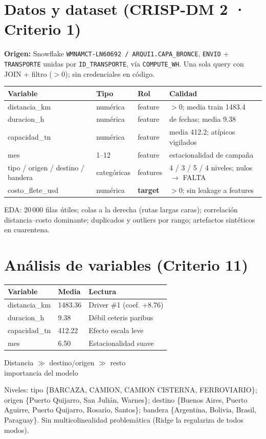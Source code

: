\documentclass[11pt]{article}
\begin{document}
\section{Datos y dataset (CRISP-DM 2 · Criterio 1)}
\textbf{Origen:} Snowflake \texttt{WMNAMCT-LN60692 / ARQUI1.CAPA\_BRONCE},
\texttt{ENVIO} + \texttt{TRANSPORTE} unidas por \texttt{ID\_TRANSPORTE}, vía
\texttt{COMPUTE\_WH}. Una sola query con JOIN + filtro ($>0$); sin credenciales en código.
{\small
\begin{center}
\begin{tabular}{llll}
\toprule Variable & Tipo & Rol & Calidad \\
\midrule distancia\_km & numérica & feature & $>0$; media train 1483.4 \\
duracion\_h & numérica & feature & de fechas; media 9.38 \\
capacidad\_tn & numérica & feature & media 412.2; atípicos vigilados \\
mes & 1--12 & feature & estacionalidad de campaña \\
tipo / origen / destino / bandera & categóricas & features & 4 / 3 / 5 / 4 niveles; nulos $\to$ FALTA \\
costo\_flete\_usd & numérica & \textbf{target} & $>0$; sin leakage a features \\
\bottomrule
\end{tabular}
\end{center}}
EDA: 20\,000 filas útiles; colas a la derecha (rutas largas caras); correlación
distancia--costo dominante; duplicados y outliers por rango; artefactos sintéticos en cuarentena.
\section{Análisis de variables (Criterio 11)}
\begin{center}
\begin{minipage}{0.55\linewidth}
{\small
\begin{tabular}{lll}
\toprule Variable & Media & Lectura \\
\midrule distancia\_km & 1483.36 & Driver \#1 (coef. +8.76) \\
duracion\_h & 9.38 & Débil ceteris paribus \\
capacidad\_tn & 412.22 & Efecto escala leve \\
mes & 6.50 & Estacionalidad suave \\
\bottomrule
\end{tabular}}
\end{minipage}\hfill
\begin{minipage}{0.42\linewidth}
\begin{kpi}Distancia $\gg$ destino/origen $\gg$ resto\\{\small importancia del modelo}\end{kpi}
\end{minipage}
\end{center}
Niveles: tipo \{BARCAZA, CAMION, CAMION CISTERNA, FERROVIARIO\};
origen \{Puerto Quijarro, San Julián, Warnes\};
destino \{Buenos Aires, Puerto Aguirre, Puerto Quijarro, Rosario, Santos\};
bandera \{Argentina, Bolivia, Brasil, Paraguay\}. Sin multicolinealidad problemática
(Ridge la regulariza de todos modos).
\end{document}
